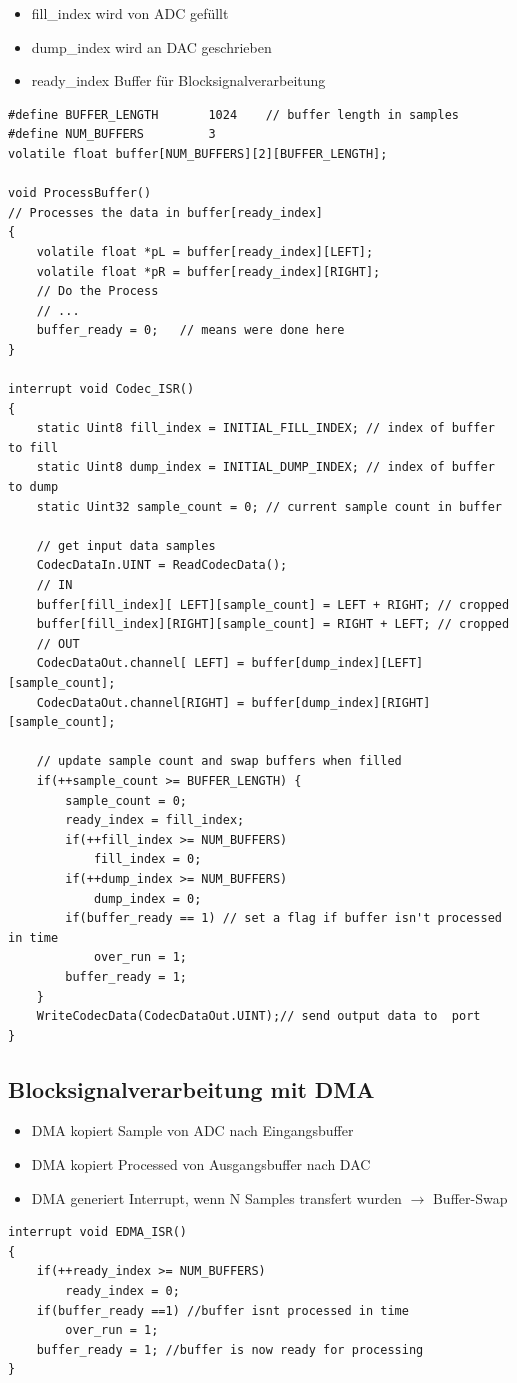 \documentclass[10pt,a4paper]{article}
\begin{document}
\begin{itemize}
    \item fill\_index wird von ADC gefüllt
    \item dump\_index wird an DAC geschrieben
    \item ready\_index Buffer für Blocksignalverarbeitung
\end{itemize}

\begin{verbatim}
#define BUFFER_LENGTH   	1024	// buffer length in samples 
#define NUM_BUFFERS         3
volatile float buffer[NUM_BUFFERS][2][BUFFER_LENGTH];

void ProcessBuffer()
// Processes the data in buffer[ready_index]
{
    volatile float *pL = buffer[ready_index][LEFT];
    volatile float *pR = buffer[ready_index][RIGHT];
    // Do the Process
    // ...
    buffer_ready = 0;   // means were done here
}

interrupt void Codec_ISR()
{                    
    static Uint8 fill_index = INITIAL_FILL_INDEX; // index of buffer to fill
    static Uint8 dump_index = INITIAL_DUMP_INDEX; // index of buffer to dump
    static Uint32 sample_count = 0; // current sample count in buffer

    // get input data samples
  	CodecDataIn.UINT = ReadCodecData();		
  	// IN
    buffer[fill_index][ LEFT][sample_count] = LEFT + RIGHT; // cropped
    buffer[fill_index][RIGHT][sample_count] = RIGHT + LEFT; // cropped
    // OUT
    CodecDataOut.channel[ LEFT] = buffer[dump_index][LEFT][sample_count];
    CodecDataOut.channel[RIGHT] = buffer[dump_index][RIGHT][sample_count];

    // update sample count and swap buffers when filled 
    if(++sample_count >= BUFFER_LENGTH) {
        sample_count = 0;
        ready_index = fill_index;
        if(++fill_index >= NUM_BUFFERS)
            fill_index = 0;
        if(++dump_index >= NUM_BUFFERS)
            dump_index = 0;
        if(buffer_ready == 1) // set a flag if buffer isn't processed in time 
            over_run = 1;
        buffer_ready = 1;
    }
	WriteCodecData(CodecDataOut.UINT);// send output data to  port
}
\end{verbatim}
\subsection{Blocksignalverarbeitung mit DMA}
\begin{itemize}
    \item DMA kopiert Sample von ADC nach Eingangsbuffer
    \item DMA kopiert Processed von Ausgangsbuffer nach DAC
    \item DMA generiert Interrupt, wenn N Samples transfert wurden $\rightarrow$ Buffer-Swap
\end{itemize}
\begin{verbatim}
interrupt void EDMA_ISR()
{
    if(++ready_index >= NUM_BUFFERS)
        ready_index = 0;
    if(buffer_ready ==1) //buffer isnt processed in time
        over_run = 1;
    buffer_ready = 1; //buffer is now ready for processing
}
\end{verbatim}
\end{document}
